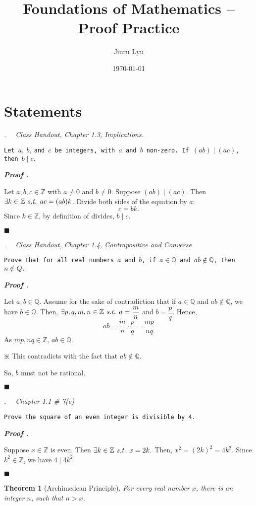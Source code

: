 \documentclass[11pt,letter]{article}
\title{Foundations of Mathematics -- \textbf{Proof Practice}}
\author{Jiuru Lyu}
\date{\today}
\newcounter{nq}[section]
\newcounter{np}[section]
\newtheorem{thm}{Theorem}[section]
\newenvironment*{p}{\par\noindent\textbf{\textit{Proof \stepcounter{np}\thenp. }}\par}{\par\hfill $\blacksquare$\par}
\newenvironment*{q}[1]{\noindent\emph{\thesection.\stepcounter{nq}\thenq$\quad $ #1}\par\noindent\texttt}{}
\def\Z{{\mathbb{Z}}}
\def\Q{{\mathbb{Q}}}
\def\st{\emph{ s.t. }}
\begin{document}
\section{Statements}
\begin{framed}\begin{q}
	{Class Handout, Chapter 1.3, Implications.}
	{Let $a,\ b,\ $and $c$ be integers, with $a$ and $b$ non-zero. If $(ab)\mid(ac)$, then $b\mid c.$}
\end{q}\end{framed}
\begin{p}
	Let	$a,b,c\in\Z$ with $a\neq0$ and $b\neq0$. Suppose $(ab)\mid(ac)$. Then $\exists k\in\Z\st ac=(ab)k$. Divide both sides of the equation by $a$: \[c=bk.\] Since $k\in\Z$, by definition of divides, $b\mid c$.
\end{p}

\begin{framed}\begin{q}
	{Class Handout, Chapter 1.4, Contrapositive and Converse}
	{Prove that for all real numbers $a$ and $b$, if $a\in\Q$ and $ab\notin\Q$, then $n\notin Q$.}	
\end{q}\end{framed}
\begin{p}
	Let $a,b\in\Q$. Assume for the sake of contradiction that if $a\in\Q$ and $ab\notin\Q$, we have $b\in\Q$. Then, $\exists p,q,m,n\in\Z\st a=\dfrac{m}{n}$ and $b=\dfrac{p}{q}$. Hence, \[ab=\frac{m}{n}\cdot\frac{p}{q}=\frac{mp}{nq}\] As $mp, nq\in\Z$, $ab\in\Q.$\begin{center}$\divideontimes$ This contradicts with the fact that $ab\notin\Q$.\end{center} So, $b$ must not be rational. 
\end{p}

\begin{framed}\begin{q}
{Chapter 1.1 \# 7(c)}
{Prove the square of an even integer is divisible by 4.}	
\end{q}\end{framed}
\begin{p}
	Suppose $x\in\Z$ is even. Then $\exists k\in\Z\st x=2k.$ Then, $x^2=(2k)^2=4k^2.$ Since $k^2\in\Z$, we have $4\mid 4k^2$.
\end{p}

\begin{thm}[Archimedean Principle]\label{AP}
	For every real number $x$, there is an integer $n$, such that $n>x$.	
\end{thm}
\end{document}
